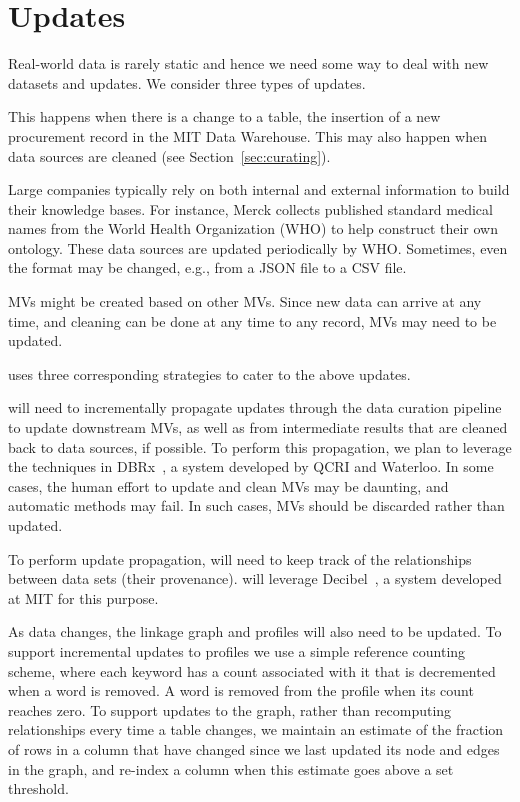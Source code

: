 \vspace{-.1em}
\section{Updates}
\label{sec:updates}

Real-world data is rarely static and hence we need some way to deal with new datasets and updates. We consider three types of updates.

 This happens when there is a
change to a table, \eg the insertion of a new procurement record in the MIT Data
Warehouse. This may also happen when data sources are cleaned (see
Section~\ref{sec:curating}).


 Large companies typically rely on
both internal and external information to build their knowledge bases. For
instance, Merck collects published standard medical names from the World Health
Organization (WHO) to help construct their own ontology. These data sources are
updated periodically by WHO.  Sometimes, even the format may be changed, e.g.,
from a JSON file to a CSV file.


 MVs might be created based on other MVs.  Since
new data can arrive at any time, and cleaning can be done at any time to any record, MVs may need to be
updated.


\dcv uses three corresponding strategies to cater to the above updates.

 \dcv will need to incrementally propagate updates through the data curation pipeline to update downstream MVs, as well as from intermediate results that are cleaned back to data sources, if possible.
To perform this propagation, we plan to leverage the techniques in DBRx~\cite{DBLP:conf/sigmod/ChalamallaIOP14}, a system developed by QCRI and Waterloo.
In some cases, the human effort to update and clean MVs may be daunting, and automatic methods may fail. In such cases, MVs should be discarded rather than updated. 

  To perform update propagation, \dcv will need to keep track of the relationships between data sets (their provenance). \dcv will leverage Decibel~\cite{DBLP:journals/pvldb/MaddoxGEMPD16}, a system developed at MIT for this purpose.

  As data changes, the linkage graph and profiles will also need to be updated.  To support incremental updates  to profiles we  use a simple reference counting scheme, where each keyword has a count associated with it that is decremented when a word is removed.  A word
is removed from the profile when its count reaches zero.  To support updates to the graph, rather than recomputing relationships every time a table changes, we 
maintain an estimate of the fraction of rows in a column that have changed since we last updated its node and edges in the graph, and re-index a column when
this estimate goes above a set threshold.


